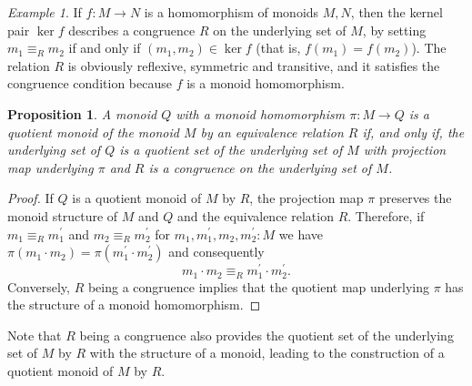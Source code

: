\documentclass{amsart}
\theoremstyle{plain}
\numberwithin{equation}{section} %
\numberwithin{figure}{section} %
\theoremstyle{plain}
\theoremstyle{plain}
\theoremstyle{plain}
\theoremstyle{plain}
\theoremstyle{plain}
\newtheorem{prop}[thm]{Proposition} %
\theoremstyle{plain}
\theoremstyle{remark}
\theoremstyle{remark}
\theoremstyle{remark}
\newtheorem{exm}[thm]{Example}
\begin{document}
\begin{exm}   %
If $f : M \rightarrow N$ is a homomorphism of monoids $M, N$, then the kernel pair $\ker f$ describes a congruence $R$ on the underlying set of $M$, by setting $m_1 \equiv_R m_2$ if and only if $(m_1, m_2) \in \ker f$ (that is, $f(m_1) = f(m_2)$). The relation $R$ is obviously reflexive, symmetric and transitive, and it satisfies the congruence condition because $f$ is a monoid homomorphism.
\end{exm}

\begin{prop}    \label{monoid-cong-quot-prop}
A monoid $Q$ with a monoid homomorphism $\pi : M \rightarrow Q$ is a quotient monoid of the monoid $M$ by an equivalence relation $R$ if, and only if, the underlying set of $Q$ is a quotient set of the underlying set of $M$ with projection map underlying $\pi$ and $R$ is a congruence on the underlying set of $M$.
\end{prop}
\begin{proof}
If $Q$ is a quotient monoid of $M$ by $R$, the projection map $\pi$ preserves the monoid structure of $M$ and $Q$ and the equivalence relation $R$. Therefore, if $m_1 \equiv_R m_1^\prime$ and $m_2 \equiv_R m_2^\prime$ for $m_1, m_1^\prime, m_2, m_2^\prime : M$ we have $\pi(m_1 \cdot m_2) = \pi(m_1^\prime \cdot m_2^\prime)$ and consequently
\[ m_1 \cdot m_2 \equiv_R m_1^\prime \cdot m_2^\prime. \]
Conversely, $R$ being a congruence implies that the quotient map underlying $\pi$ has the structure of a monoid homomorphism. 
\end{proof}

Note that $R$ being a congruence also provides the quotient set of the underlying set of $M$ by $R$ with the structure of a monoid, leading to the construction of a quotient monoid of $M$ by $R$.
\end{document}
